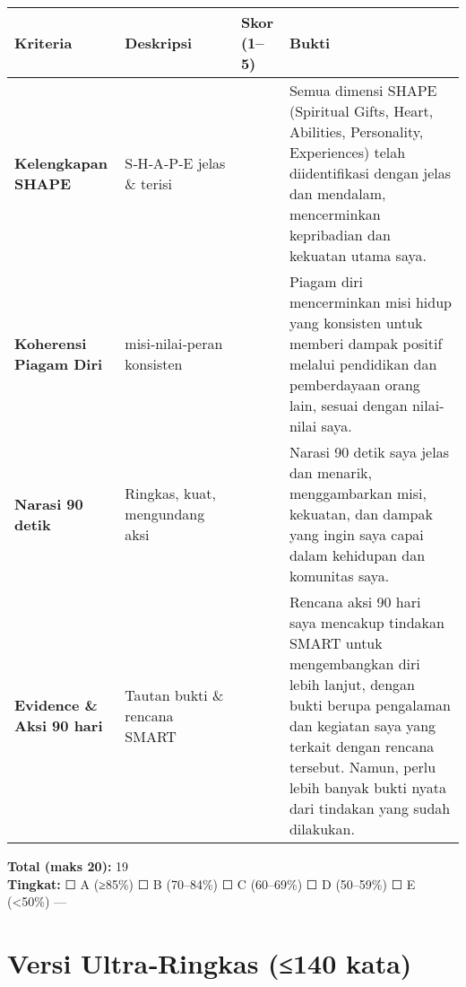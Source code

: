 \documentclass[
  letterpaper,
  DIV=11,
  numbers=noendperiod]{scrreprt}
\begin{document}
\begin{longtable}[]{@{}
  >{\raggedright\arraybackslash}p{}
  >{\raggedright\arraybackslash}p{}
  >{\raggedleft\arraybackslash}p{}
  >{\raggedright\arraybackslash}p{}@{}}
\toprule\noalign{}
\begin{minipage}[b]{\linewidth}\raggedright
Kriteria
\end{minipage} & \begin{minipage}[b]{\linewidth}\raggedright
Deskripsi
\end{minipage} & \begin{minipage}[b]{\linewidth}\raggedleft
Skor (1--5)
\end{minipage} & \begin{minipage}[b]{\linewidth}\raggedright
Bukti
\end{minipage} \\
\midrule\noalign{}
\endhead
\bottomrule\noalign{}
\endlastfoot
\textbf{Kelengkapan SHAPE} & S‑H‑A‑P‑E jelas \& terisi & 5 & Semua
dimensi SHAPE (Spiritual Gifts, Heart, Abilities, Personality,
Experiences) telah diidentifikasi dengan jelas dan mendalam,
mencerminkan kepribadian dan kekuatan utama saya. \\
\textbf{Koherensi Piagam Diri} & misi‑nilai‑peran konsisten & 5 & Piagam
diri mencerminkan misi hidup yang konsisten untuk memberi dampak positif
melalui pendidikan dan pemberdayaan orang lain, sesuai dengan
nilai-nilai saya. \\
\textbf{Narasi 90 detik} & Ringkas, kuat, mengundang aksi & 5 & Narasi
90 detik saya jelas dan menarik, menggambarkan misi, kekuatan, dan
dampak yang ingin saya capai dalam kehidupan dan komunitas saya. \\
\textbf{Evidence \& Aksi 90 hari} & Tautan bukti \& rencana SMART & 4 &
Rencana aksi 90 hari saya mencakup tindakan SMART untuk mengembangkan
diri lebih lanjut, dengan bukti berupa pengalaman dan kegiatan saya yang
terkait dengan rencana tersebut. Namun, perlu lebih banyak bukti nyata
dari tindakan yang sudah dilakukan. \\
\end{longtable}

\textbf{Total (maks 20):} 19\\
\textbf{Tingkat:} ☐ A (≥85\%) ☐ B (70--84\%) ☐ C (60--69\%) ☐ D
(50--59\%) ☐ E (\textless50\%) ---

\section{Versi Ultra‑Ringkas (≤140
kata)}\label{versi-ultraringkas-140-kata}
\end{document}
